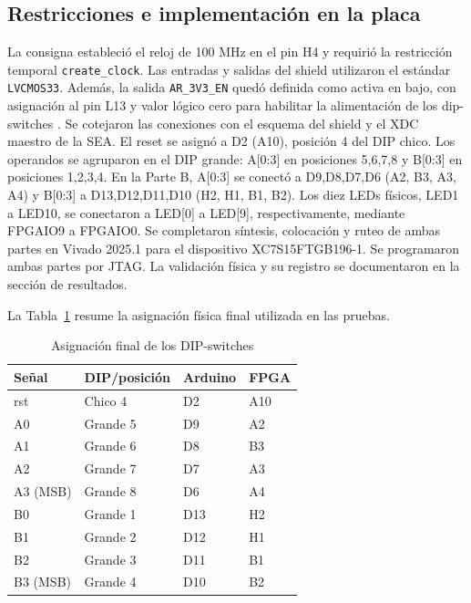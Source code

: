 \subsection{Restricciones e implementación en la placa}
La consigna estableció el reloj de 100 MHz en el pin H4 y requirió la restricción temporal \texttt{create\_clock}. Las entradas y salidas del shield utilizaron el estándar \texttt{LVCMOS33}. Además, la salida \texttt{AR\_3V3\_EN} quedó definida como activa en bajo, con asignación al pin L13 y valor lógico cero para habilitar la alimentación de los dip-switches \cite{consigna}. Se cotejaron las conexiones con el esquema del shield y el XDC maestro de la SEA. El reset se asignó a D2 (A10), posición 4 del DIP chico. Los operandos se agruparon en el DIP grande: A[0:3] en posiciones 5,6,7,8 y B[0:3] en posiciones 1,2,3,4. En la Parte B, A[0:3] se conectó a D9,D8,D7,D6 (A2, B3, A3, A4) y B[0:3] a D13,D12,D11,D10 (H2, H1, B1, B2). Los diez LEDs físicos, LED1 a LED10, se conectaron a LED[0] a LED[9], respectivamente, mediante FPGAIO9 a FPGAIO0. Se completaron síntesis, colocación y ruteo de ambas partes en Vivado 2025.1 para el dispositivo XC7S15FTGB196-1. Se programaron ambas partes por JTAG. La validación física y su registro se documentaron en la sección de resultados.


La Tabla~\ref{tab:dipfinal} resume la asignación física final utilizada en las pruebas.
\begin{table}[!t]
\centering\caption{Asignación final de los DIP-switches}\label{tab:dipfinal}
\begin{tabular}{@{}llll@{}}\toprule
Señal & DIP/posición & Arduino & FPGA\\\midrule
rst & Chico 4 & D2 & A10\\
A0 & Grande 5 & D9 & A2\\
A1 & Grande 6 & D8 & B3\\
A2 & Grande 7 & D7 & A3\\
A3 (MSB) & Grande 8 & D6 & A4\\
B0 & Grande 1 & D13 & H2\\
B1 & Grande 2 & D12 & H1\\
B2 & Grande 3 & D11 & B1\\
B3 (MSB) & Grande 4 & D10 & B2\\\bottomrule
\end{tabular}
\end{table}

